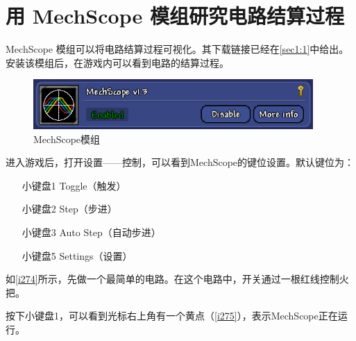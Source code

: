 \section{用 MechScope 模组研究电路结算过程}
MechScope 模组可以将电路结算过程可视化。其下载链接已经在\autoref{sec1:1}中给出。安装该模组后，在游戏内可以看到电路的结算过程。

\begin{figure}[!ht]
\includegraphics[width=0.95\textwidth]{images/273.png}
\caption{MechScope模组}\label{i273}
\end{figure}

进入游戏后，打开设置——控制，可以看到MechScope的键位设置。默认键位为：
\begin{itemize}
\item[小键盘1] Toggle（触发）
\item[小键盘2] Step（步进）
\item[小键盘3] Auto Step（自动步进）
\item[小键盘5] Settings（设置）
\end{itemize}

如\autoref{i274}所示，先做一个最简单的电路。在这个电路中，开关通过一根红线控制火把。
\begin{figure}[!ht]
\begin{center}
\qquad
{}
\end{center}
\caption{}
\end{figure}

按下小键盘1，可以看到光标右上角有一个黄点（\autoref{i275}），表示MechScope正在运行。
\begin{figure}[!ht]
\begin{center}
\qquad
{}
\end{center}
\caption{}
\end{figure}

